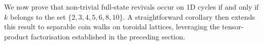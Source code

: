 We now prove that non-trivial full-state revivals occur on 1D cycles if
and only if \(k\) belongs to the set \(\{2,3,4,5,6,8,10\}\). A
straightforward corollary then extends this result to separable coin
walks on toroidal lattices, leveraging the tensor-product factorisation
established in the preceding section.

